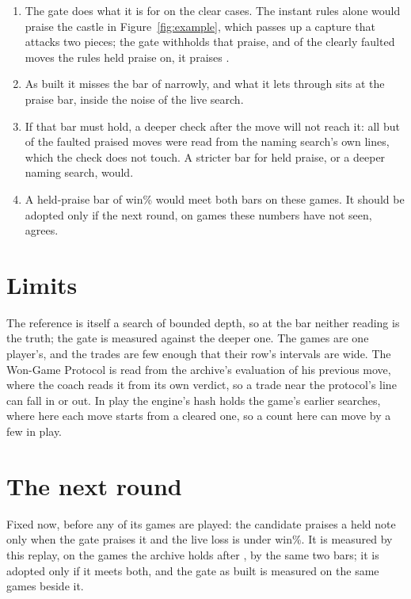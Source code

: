 \documentclass[11pt]{article}
\begin{document}
\begin{enumerate}[leftmargin=*]
\item The gate does what it is for on the clear cases. The instant rules alone would praise the
castle in Figure~\ref{fig:example}, which passes up a capture that attacks two pieces; the gate
withholds that praise, and of the \ClearAll{} clearly faulted moves the rules held praise on, it
praises \ClearPraised.
\item As built it misses the bar of \RuleFaulted{} narrowly, and what it lets through sits at the
praise bar, inside the noise of the live search.
\item If that bar must hold, a deeper check after the move will not reach it: all but
\FaultedPraisedOutOfLines{} of the faulted praised moves were read from the naming search's own
lines, which the check does not touch. A stricter bar for held praise, or a deeper naming search,
would.
\item A held-praise bar of \CandidateBar{} win\% would meet both bars on these games. It should be
adopted only if the next round, on games these numbers have not seen, agrees.
\end{enumerate}

\section{Limits}

The reference is itself a search of bounded depth, so at the bar neither reading is the truth;
the gate is measured against the deeper one. The games are one player's, and the trades are few
enough that their row's intervals are wide. The Won-Game Protocol is read from the archive's
evaluation of his previous move, where the coach reads it from its own verdict, so a trade near
the protocol's line can fall in or out. In play the engine's hash holds the game's earlier
searches, where here each move starts from a cleared one, so a count here can move by a few in
play.

\section{The next round}

Fixed now, before any of its games are played: the candidate praises a held note only when the
gate praises it and the live loss is under \CandidateBar{} win\%. It is measured by this replay, on the games
the archive holds after \ArchiveThrough, by the same two bars; it is adopted only if it meets
both, and the gate as built is measured on the same games beside it.
\end{document}
